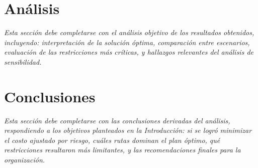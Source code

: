 \documentclass[11pt,a4paper]{article}
\begin{document}
\section{An\'alisis}

\noindent\textit{Esta secci\'on debe completarse con el an\'alisis objetivo de los resultados obtenidos, incluyendo: interpretaci\'on de la soluci\'on \'optima, comparaci\'on entre escenarios, evaluaci\'on de las restricciones m\'as cr\'iticas, y hallazgos relevantes del an\'alisis de sensibilidad.}

\section{Conclusiones}

\noindent\textit{Esta secci\'on debe completarse con las conclusiones derivadas del an\'alisis, respondiendo a los objetivos planteados en la Introducci\'on: si se logr\'o minimizar el costo ajustado por riesgo, cu\'ales rutas dominan el plan \'optimo, qu\'e restricciones resultaron m\'as limitantes, y las recomendaciones finales para la organizaci\'on.}

\end{document}

